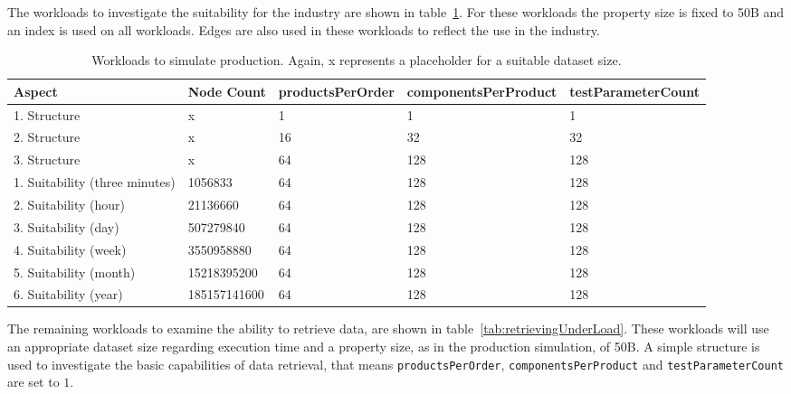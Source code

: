 The workloads to investigate the suitability for the industry are shown in table~\ref{tab:productionSimulation}.
For these workloads the property size is fixed to 50B and an index is used on all workloads.
Edges are also used in these workloads to reflect the use in the industry.

\begin{table}[!h]
  \begin{minipage}{\textwidth}
    \begin{tabularx}{\textwidth}{ | X | X | X | X | X | }
      \hline
      Aspect & Node Count & products\-Per\-Order & components\-Per\-Product & test\-Parameter\-Count \\ \hline
      1. Structure & x & 1 & 1 & 1 \\ \hline
      2. Structure & x & 16 & 32 & 32 \\ \hline
      3. Structure & x & 64 & 128 & 128 \\ \hline
      1. Suitability (three minutes) & 1056833 & 64 & 128 & 128 \\ \hline
      2. Suitability (hour) & 21136660 & 64 & 128 & 128 \\ \hline
      3. Suitability (day) & 507279840 & 64 & 128 & 128 \\ \hline
      4. Suitability (week) & 3550958880 & 64 & 128 & 128 \\ \hline
      5. Suitability (month) & 15218395200 & 64 & 128 & 128 \\ \hline
      6. Suitability (year) & 185157141600 & 64 & 128 & 128 \\ \hline
    \end{tabularx}
  \end{minipage}
  \caption{Workloads to simulate production. Again, x represents a placeholder for a suitable dataset size.}
  \label{tab:productionSimulation}
\end{table}

The remaining workloads to examine the ability to retrieve data,
are shown in table~\ref{tab:retrievingUnderLoad}.
These workloads will use an appropriate dataset size regarding execution time and a property size,
as in the production simulation,
of 50B.
A simple structure is used to investigate the basic capabilities of data retrieval,
that means \texttt{productsPerOrder},
\texttt{componentsPerProduct} and \texttt{testParameterCount} are set to $ 1 $.

